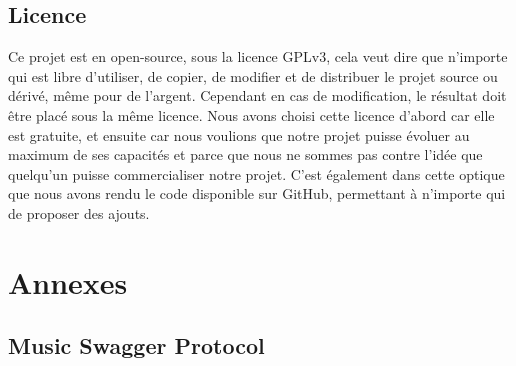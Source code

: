\documentclass[12pt]{article}
\begin{document}
	\subsection{Licence}
	Ce projet est en open-source, sous la licence GPLv3, cela veut dire que n’importe qui est libre d’utiliser, de copier, de modifier et de distribuer le projet source ou dérivé, même pour de l’argent. Cependant en cas de modification, le résultat doit être placé sous la même licence. Nous avons choisi cette licence d’abord car elle est gratuite, et ensuite car nous voulions que notre projet puisse évoluer au maximum de ses capacités et parce que nous ne sommes pas contre l’idée que quelqu’un puisse commercialiser notre projet. C’est également dans cette optique que nous avons rendu le code disponible sur GitHub, permettant à n’importe qui de proposer des ajouts.
	\newpage
	\section*{Annexes}
	\subsection*{Music Swagger Protocol}
	\inputminted[breaklines]{text}{MusicSwaggerProtocol.txt}
	\newpage
\end{document}

